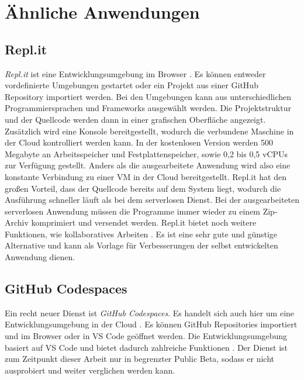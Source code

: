 \chapter{Ähnliche Anwendungen}

\section{Repl.it}
\emph{Repl.it} ist eine Entwicklungsumgebung im Browser \cite{Replit}. Es können
entweder vordefinierte Umgebungen gestartet oder ein Projekt aus
einer GitHub Repository importiert werden. Bei den Umgebungen
kann aus unterschiedlichen Programmiersprachen und Frameworks ausgewählt
werden. Die Projektstruktur und der Quellcode werden dann in einer grafischen Oberfläche
angezeigt. Zusätzlich wird eine Konsole bereitgestellt, wodurch die
verbundene Maschine in der Cloud kontrolliert werden kann. In der kostenlosen
Version werden 500 Megabyte an Arbeitsspeicher und Festplattenspeicher,
sowie 0,2 bis 0,5 vCPUs zur Verfügung gestellt.
Anders als die ausgearbeitete Anwendung wird also eine konstante Verbindung
zu einer VM in der Cloud bereitgestellt.
Repl.it hat den großen Vorteil, dass der Quellcode bereits auf dem System liegt,
wodurch die Ausführung schneller läuft als bei dem serverlosen Dienst.
Bei der ausgearbeiteten serverlosen Anwendung müssen die Programme
immer wieder zu einem Zip-Archiv komprimiert und versendet werden.
Repl.it bietet noch weitere Funktionen, wie kollaboratives Arbeiten \cite{Replit}.
Es ist eine sehr gute und günstige Alternative und kann als Vorlage
für Verbesserungen der selbst entwickelten Anwendung dienen.

\section{GitHub Codespaces}
Ein recht neuer Dienst ist \emph{GitHub Codespaces}.
Es handelt sich auch hier um eine Entwicklungsumgebung in der Cloud \cite{GithunCodespaces}.
Es können GitHub Repositories importiert und im Browser oder
in VS Code geöffnet werden. Die Entwicklungsumgebung
basiert auf VS Code und bietet dadurch zahlreiche Funktionen \cite{GithunCodespacesDocs}.
Der Dienst ist zum Zeitpunkt dieser Arbeit nur in begrenzter Public Beta, sodass
er nicht ausprobiert und weiter verglichen werden kann.